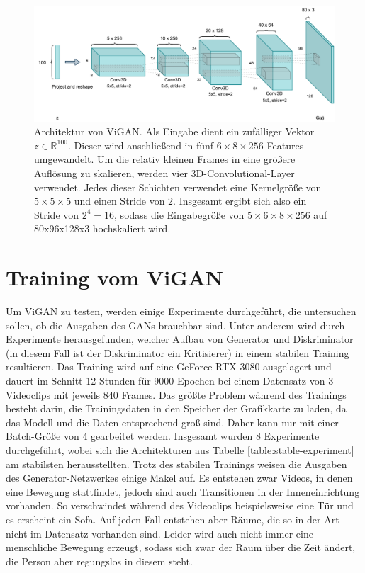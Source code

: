 \begin{figure}
    \centering
    \includegraphics[width=\textwidth]{images/ViGAN.pdf}
    \caption{Architektur von ViGAN. Als Eingabe dient ein zufälliger Vektor $z
    \in \mathbb{R}^{100}$. Dieser wird anschließend in fünf $6 \times 8 \times
    256$ Features umgewandelt. Um die relativ kleinen Frames in eine größere
    Auflösung zu skalieren, werden vier 3D-Convolutional-Layer verwendet. Jedes
    dieser Schichten verwendet eine Kernelgröße von $5 \times 5 \times 5$ und
    einen Stride von 2.  Insgesamt ergibt sich also ein Stride von $2^4 = 16$,
    sodass die Eingabegröße von $5 \times 6 \times 8 \times 256$ auf 80x96x128x3
    hochskaliert wird.}
    \label{fig:vigan}
\end{figure}

\section{Training vom ViGAN}
Um ViGAN zu testen, werden einige Experimente durchgeführt, die untersuchen
sollen, ob die Ausgaben des GANs brauchbar sind. Unter anderem wird durch
Experimente herausgefunden, welcher Aufbau von Generator und Diskriminator (in
diesem Fall ist der Diskriminator ein Kritisierer) in einem stabilen Training
resultieren. Das Training wird auf eine GeForce RTX 3080 ausgelagert und dauert
im Schnitt 12 Stunden für 9000 Epochen bei einem Datensatz von 3 Videoclips mit
jeweils 840 Frames. Das größte Problem während des Trainings besteht darin, die
Trainingsdaten in den Speicher der Grafikkarte zu laden, da das Modell und die
Daten entsprechend groß sind. Daher kann nur mit einer Batch-Größe von 4
gearbeitet werden. Insgesamt wurden 8 Experimente durchgeführt, wobei sich die
Architekturen aus Tabelle \ref{table:stable-experiment} am stabilsten
herausstellten. Trotz des stabilen Trainings weisen die Ausgaben des
Generator-Netzwerkes einige Makel auf. Es entstehen zwar Videos, in denen eine
Bewegung stattfindet, jedoch sind auch Transitionen in der Inneneinrichtung
vorhanden. So verschwindet während des Videoclips beispielsweise eine Tür und es
erscheint ein Sofa. Auf jeden Fall entstehen aber Räume, die so in der Art nicht
im Datensatz vorhanden sind. Leider wird auch nicht immer eine menschliche
Bewegung erzeugt, sodass sich zwar der Raum über die Zeit ändert, die Person
aber regungslos in diesem steht.

